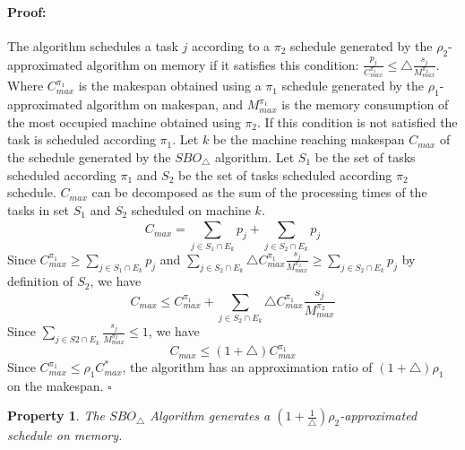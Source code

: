 \documentclass[12pt]{article}
\theoremstyle{mystyle}
\newtheorem{property}[theorem]{Property}
\newenvironment{myproof}{\paragraph{Proof:}}{\hfill$\square$}
\begin{document}
   \begin{myproof}
  The algorithm schedules a task $j$ according to a $\pi_2$ schedule generated by the $\rho_2$-approximated algorithm on memory if it satisfies  this condition: $\frac{{p_j}}{{C}^{\pi_1}_{max}} \leq \triangle \frac{s_j}{M^{\pi_2}_{max}}$.  Where ${C}^{\pi_1}_{max}$ is the makespan obtained using a $\pi_1$ schedule generated by the  $\rho_1$-approximated algorithm on makespan, and ${M}^{\pi_1}_{max}$ is the memory consumption of the most occupied machine obtained using $\pi_2$.  If this condition is not satisfied the task is scheduled according $\pi_1$.
   Let $k$ be the machine reaching makespan $C_{max}$ of the schedule generated by the $SBO_\triangle$ algorithm. Let  $S_1$ be the set of tasks scheduled according $\pi_1$ and $S_2$ be the set of tasks scheduled according $\pi_2$ schedule.  $C_{max}$ can be decomposed as the sum of the processing times of the tasks in set $S_1$ and $S_2$ scheduled on machine $k$.
                          \begin{equation}\nonumber
                    C_{max}= \sum_{j \in S_1 \cap E_k}^{}p_j+\sum_{j \in S_2 \cap E_k}^{}p_j 
                          \end{equation}                   
   Since $C^{\pi_1}_{max} \geq \sum\limits
                          _{j \in S_1 \cap E_k}^{}p_j$ and $\sum\limits
                          _{j \in S_2\cap E_k}\triangle {{C}^{\pi_1}_{max}} \frac{s_j}{M^{\pi_2}_{max}}\geq \sum\limits
                          _{j \in S_2\cap E_k}{p}_j $ by definition of $S_2$, we have
          \begin{equation}\nonumber
      C_{max}\leq C^{\pi_1}_{max}+\sum_{j \in S_2\cap E_k}^{}\triangle {{C}^{\pi_1}_{max}} \frac{s_j}{M^{\pi_2}_{max}}
                                 \end{equation}        
        Since $\sum\limits_{j \in S2\cap E_k} \frac{s_j}{M^{\pi_2}_{max}}\leq 1$, we have
   \begin{equation}\nonumber                       C_{max}\leq(1+\triangle){C}^{\pi_1}_{max}                \end{equation}
  Since ${C}^{\pi_1}_{max} \leq \rho_1 {C}^{*}_{max}$, the algorithm has an approximation ratio of $ (1+\triangle)  \rho_1$ on the makespan.
  \end{myproof}
  \begin{property}\cite{10.1109/IPDPS.2008.4536292}
    The $SBO_\triangle$ Algorithm generates a $ (1+\frac{1}{\triangle})  \rho_2$-approximated schedule on memory.
    \end{property}         
\end{document}
